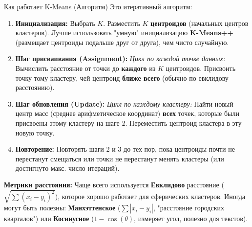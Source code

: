 \begin{textbox}{Как работает K-Means (Алгоритм)}
    Это итеративный алгоритм:
    \begin{enumerate}
        \item \textbf{Инициализация:} Выбрать $K$. Разместить $K$ \textbf{центроидов} (начальных центров кластеров). Лучше использовать "умную" инициализацию \textbf{K-Means++} (размещает центроиды подальше друг от друга), чем чисто случайную.
        \item \textbf{Шаг присваивания (Assignment):} \textit{Цикл по каждой точке данных:} Вычислить расстояние от точки до \textbf{каждого} из $K$ центроидов. Присвоить точку тому кластеру, чей центроид \textbf{ближе всего} (обычно по евклидову расстоянию).
        \item \textbf{Шаг обновления (Update):} \textit{Цикл по каждому кластеру:} Найти новый центр масс (среднее арифметическое координат) \textbf{всех} точек, которые были присвоены этому кластеру на шаге 2. Переместить центроид кластера в эту новую точку.
        \item \textbf{Повторение:} Повторять шаги 2 и 3 до тех пор, пока центроиды почти не перестанут смещаться или точки не перестанут менять кластеры (или достигнуто макс. число итераций).
    \end{enumerate}
    \textbf{Метрики расстояния:} Чаще всего используется \textbf{Евклидово} расстояние ($\sqrt{\sum(x_i-y_i)^2}$), которое хорошо работает для сферических кластеров. Иногда могут быть полезны: \textbf{Манхэттенское} ($\sum|x_i-y_i|$, "расстояние городских кварталов") или \textbf{Косинусное} ($1 - \cos(\theta)$, измеряет угол, полезно для текстов).
\end{textbox}

